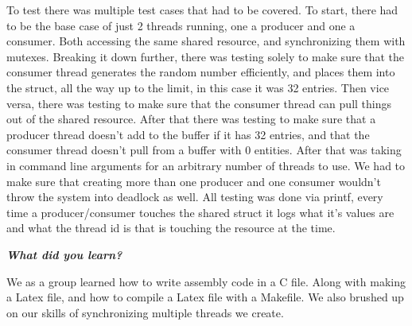\documentclass{article}
\begin{document}
        To test there was multiple test cases that had to be covered. To start, there had to be the base case of just 2 threads running, one a producer and one a consumer. Both accessing the same shared resource, and synchronizing them with mutexes. Breaking it down further, there was testing solely to make sure that the consumer thread generates the random number efficiently, and places them into the struct, all the way up to the limit, in this case it was 32 entries. Then vice versa, there was testing to make sure that the consumer thread can pull things out of the shared resource.  After that there was testing to make sure that a producer thread doesn’t add to the buffer if it has 32 entries, and that the consumer thread doesn’t pull from a buffer with 0 entities. After that was taking in command line arguments for an arbitrary number of threads to use. We had to make sure that creating more than one producer and one consumer wouldn’t throw the system into deadlock as well. All testing was done via printf, every time a producer/consumer touches the shared struct it logs what it’s values are and what the thread id is that is touching the resource at the time. \linebreak \linebreak


    \textbf{\textit{What did you learn?}}
        
            We as a group learned how to write assembly code in a C file. Along with making a Latex file, and how to compile a Latex file with a Makefile. We also brushed up on our skills of synchronizing multiple threads we create.
    \newpage
    
\end{document}
